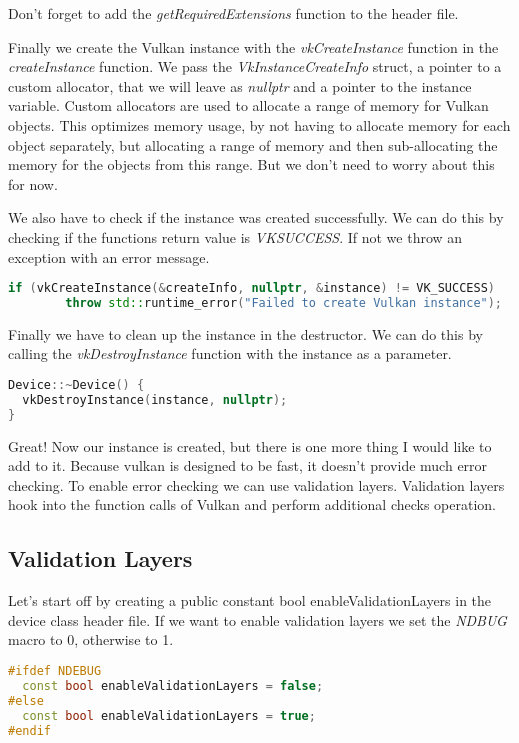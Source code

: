 \documentclass[12pt]{report} \usepackage{preamble}
\begin{document}
Don't forget to add the \textit{getRequiredExtensions} function to the header file.

Finally we create the Vulkan instance with the \textit{vkCreateInstance} function in the
\textit{createInstance} function. We pass the \textit{VkInstanceCreateInfo} struct, a pointer to
a custom allocator, that we will leave as \textit{nullptr} and a pointer to the instance variable.
Custom allocators are used to allocate a range of memory for Vulkan objects. This optimizes memory usage, by
not having to allocate memory for each object separately, but allocating a range of memory and then
sub-allocating the memory for the objects from this range. But we don't need to worry about this for now.

We also have to check if the instance was created successfully. We can do this by checking if the
functions return value is \textit{VK\textunderscore SUCCESS}. If not we throw an exception with an error message.

\begin{lstlisting}[language=C++]
if (vkCreateInstance(&createInfo, nullptr, &instance) != VK_SUCCESS) 
		throw std::runtime_error("Failed to create Vulkan instance");
\end{lstlisting}

Finally we have to clean up the instance in the destructor. We can do this by calling the
\textit{vkDestroyInstance} function with the instance as a parameter.

\begin{lstlisting}[language=C++]
Device::~Device() {
  vkDestroyInstance(instance, nullptr);
}
\end{lstlisting}

Great! Now our instance is created, but there is one more thing I would like to
add to it. Because vulkan is designed to be fast, it doesn't
provide much error checking. To enable error checking we can use validation layers.
Validation layers hook into the function calls of Vulkan and perform additional checks
operation.

\subsection{Validation Layers}

Let's start off by creating a public constant bool enableValidationLayers in the device class header file.
If we want to enable validation layers we set the \textit{NDBUG} macro to 0, otherwise to 1.

\begin{lstlisting}[language=C++]
#ifdef NDEBUG
  const bool enableValidationLayers = false;
#else
  const bool enableValidationLayers = true;
#endif
\end{lstlisting}
\end{document}
